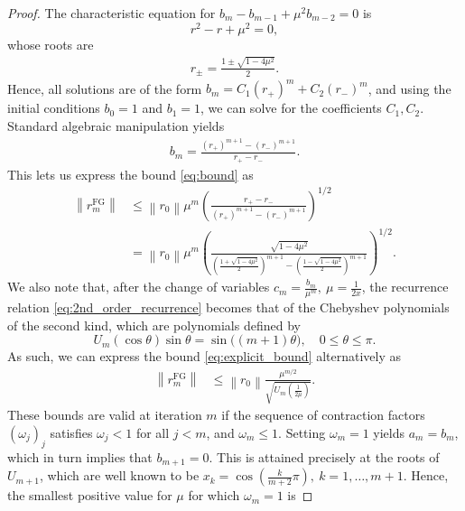 \documentclass[10pt,a4paper]{amsart}
\begin{document}
\begin{proof}
    The characteristic equation for $b_m - b_{m-1} + \mu^2 b_{m-2} = 0$ is
    $$r^2 - r + \mu^2 = 0,$$
    whose roots are
    \begin{align*}
        r_{\pm} = \frac{1 \pm \sqrt{1 - 4\mu^2}}{2}.
    \end{align*}
    Hence, all solutions are of the form $b_m = C_1(r_+)^m + C_2(r_-)^m$, and using the initial conditions $b_0 = 1$ and $b_1 = 1$, we can solve for the coefficients $C_1, C_2$. Standard algebraic manipulation yields
    \begin{align} \label{eq:bm}
        b_m = \frac{(r_+)^{m+1} - (r_-)^{m+1}}{r_+ - r_-}.
    \end{align}
    This lets us express the bound \eqref{eq:bound} as
    \begin{equation*}
        \begin{aligned}
            \left\|r_m^{\mathrm{FG}}\right\| & \leq \left\|r_0\right\| \mu^m \left(  \frac{r_+ - r_-}{(r_+)^{m+1} - (r_-)^{m+1}} \right)^{1/2}                                                                                       \\
                                             & =\left\|r_0\right\| \mu^m \left( \frac{\sqrt{1 - 4\mu^2}}{\left( \frac{1 + \sqrt{1 - 4\mu^2}}{2} \right)^{m+1} - \left( \frac{1 - \sqrt{1 - 4\mu^2}}{2} \right)^{m+1}} \right)^{1/2}.
        \end{aligned}
    \end{equation*}
    We also note that, after the change of variables $c_m = \frac{b_m}{\mu^m}, \ \mu = \frac{1}{2x}$, the recurrence relation \eqref{eq:2nd_order_recurrence} becomes that of the Chebyshev polynomials of the second kind, which are polynomials defined by 
    $$
    { U_{m}(\cos \theta )\sin \theta ={\sin }{\big (}(m+1)\theta {)}, \quad  0 \leq \theta \leq \pi.}
    $$ As such, we can express the bound \eqref{eq:explicit_bound} alternatively as
    \begin{equation*} 
        \begin{aligned}
            \left\|r_m^{\mathrm{FG}}\right\| & \leq \left\|r_0\right\| \frac{\mu^{m/2}}{\sqrt{U_m\left(\frac{1}{2\mu}\right)}}.
        \end{aligned}
    \end{equation*}
    These bounds are valid at iteration $m$ if the sequence of contraction factors $(\omega_j)_j$ satisfies $\omega_j < 1$ for all $j < m$, and $\omega_m \leq 1$. Setting $\omega_m = 1$ yields $a_m = b_m$, which in turn implies that $b_{m+1}=0.$ This is attained precisely at the roots of $U_{m+1}$, which are well known to be ${x_{k}=\cos \left({\frac {k}{m+2}}\pi \right),\ k=1,\dots ,m+1.}$ Hence, the smallest positive value for $\mu$ for which $\omega_m = 1$ is

\end{proof}
\end{document}
